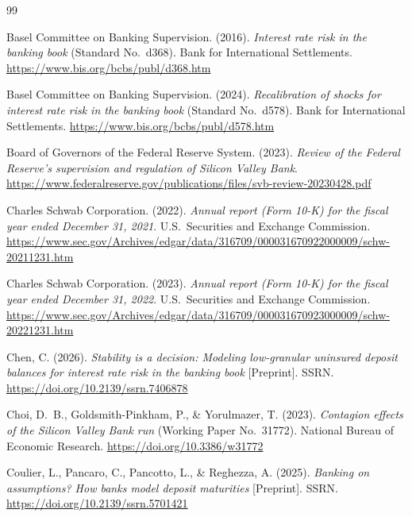 \begin{thebibliography}{99}

Basel Committee on Banking Supervision. (2016). \textit{Interest rate risk in the
banking book} (Standard No.\ d368). Bank for International Settlements.
\url{https://www.bis.org/bcbs/publ/d368.htm}

Basel Committee on Banking Supervision. (2024). \textit{Recalibration of shocks for
interest rate risk in the banking book} (Standard No.\ d578). Bank for
International Settlements. \url{https://www.bis.org/bcbs/publ/d578.htm}

Board of Governors of the Federal Reserve System. (2023). \textit{Review of the
Federal Reserve's supervision and regulation of Silicon Valley Bank}.
\url{https://www.federalreserve.gov/publications/files/svb-review-20230428.pdf}

Charles Schwab Corporation. (2022). \textit{Annual report (Form 10-K) for the
fiscal year ended December 31, 2021}. U.S.\ Securities and Exchange Commission.
\url{https://www.sec.gov/Archives/edgar/data/316709/000031670922000009/schw-20211231.htm}

Charles Schwab Corporation. (2023). \textit{Annual report (Form 10-K) for the
fiscal year ended December 31, 2022}. U.S.\ Securities and Exchange Commission.
\url{https://www.sec.gov/Archives/edgar/data/316709/000031670923000009/schw-20221231.htm}

Chen, C. (2026). \textit{Stability is a decision: Modeling low-granular uninsured
deposit balances for interest rate risk in the banking book} [Preprint]. SSRN.
\url{https://doi.org/10.2139/ssrn.7406878}

Choi, D.~B., Goldsmith-Pinkham, P., \& Yorulmazer, T. (2023). \textit{Contagion
effects of the Silicon Valley Bank run} (Working Paper No.\ 31772). National Bureau
of Economic Research. \url{https://doi.org/10.3386/w31772}

Coulier, L., Pancaro, C., Pancotto, L., \& Reghezza, A. (2025). \textit{Banking on
assumptions? How banks model deposit maturities} [Preprint]. SSRN.
\url{https://doi.org/10.2139/ssrn.5701421}


\end{thebibliography}

